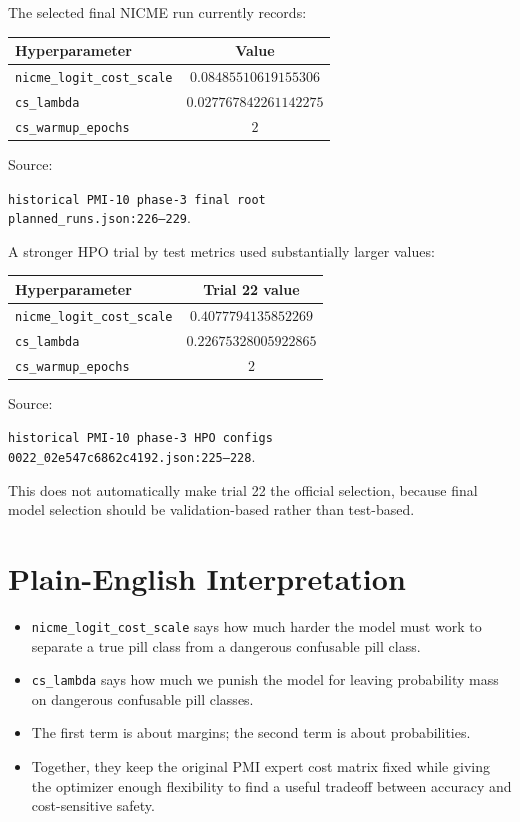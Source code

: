 \documentclass[11pt]{article}
\newcommand{\code}[1]{\texttt{#1}}
\newcommand{\pathref}[1]{\texttt{\small #1}}
\begin{document}
The selected final NICME run currently records:

\begin{center}
\begin{tabular}{lc}
\toprule
Hyperparameter & Value \\
\midrule
\code{nicme\_logit\_cost\_scale} & $0.08485510619155306$ \\
\code{cs\_lambda} & $0.027767842261142275$ \\
\code{cs\_warmup\_epochs} & $2$ \\
\bottomrule
\end{tabular}
\end{center}

\noindent Source:
\begin{flushleft}
\pathref{historical PMI-10 phase-3 final root}\\
\pathref{planned\_runs.json:226--229}.
\end{flushleft}

A stronger HPO trial by test metrics used substantially larger values:

\begin{center}
\begin{tabular}{lc}
\toprule
Hyperparameter & Trial 22 value \\
\midrule
\code{nicme\_logit\_cost\_scale} & $0.4077794135852269$ \\
\code{cs\_lambda} & $0.22675328005922865$ \\
\code{cs\_warmup\_epochs} & $2$ \\
\bottomrule
\end{tabular}
\end{center}

\noindent Source:
\begin{flushleft}
\pathref{historical PMI-10 phase-3 HPO configs}\\
\pathref{0022\_02e547c6862c4192.json:225--228}.
\end{flushleft}
This does not automatically make trial 22 the official selection, because final model selection should be validation-based rather than test-based.

\section{Plain-English Interpretation}

\begin{itemize}
  \item \code{nicme\_logit\_cost\_scale} says how much harder the model must work to separate a true pill class from a dangerous confusable pill class.
  \item \code{cs\_lambda} says how much we punish the model for leaving probability mass on dangerous confusable pill classes.
  \item The first term is about margins; the second term is about probabilities.
  \item Together, they keep the original PMI expert cost matrix fixed while giving the optimizer enough flexibility to find a useful tradeoff between accuracy and cost-sensitive safety.
\end{itemize}
\end{document}
